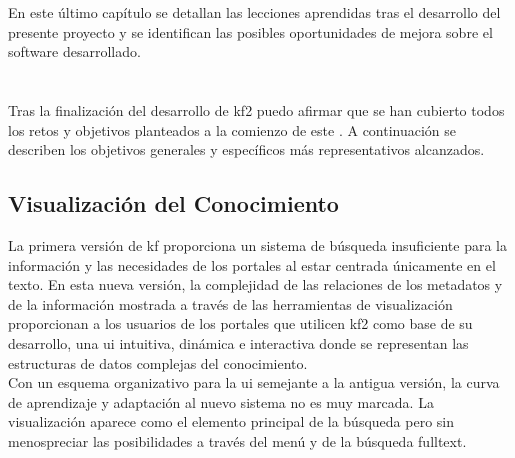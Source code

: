 

En este último capítulo se detallan las lecciones aprendidas tras el desarrollo del presente proyecto y se identifican las posibles oportunidades de mejora sobre el software desarrollado.

\section{}
Tras la finalización del desarrollo de \gls{kf2} puedo afirmar que se han cubierto todos los retos y objetivos planteados a la comienzo de este \pfc{}. A continuación se describen los objetivos generales y específicos más representativos alcanzados.

\subsection{Visualización del Conocimiento}
La primera versión de \gls{kf} proporciona un sistema de búsqueda insuficiente para la información y las necesidades de los portales al estar centrada únicamente en el texto. En esta nueva versión, la complejidad de las relaciones de los \glspl{metadato} y de la información mostrada a través de las herramientas de visualización proporcionan a los usuarios de los portales que utilicen \gls{kf2} como base de su desarrollo, una \gls{ui} intuitiva, dinámica e interactiva donde se representan las estructuras de datos complejas del conocimiento.\\

Con un esquema organizativo para la \gls{ui} semejante a la antigua versión, la curva de aprendizaje y adaptación al nuevo sistema no es muy marcada. La visualización aparece como el elemento principal de la búsqueda pero sin menospreciar las posibilidades a través del menú y de la búsqueda \gls{fulltext}.\\

